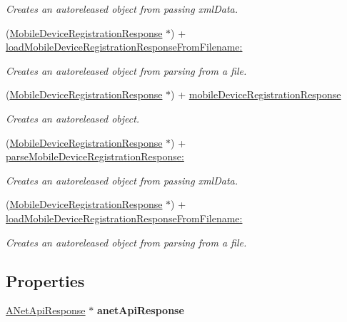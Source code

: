 \begin{DoxyCompactItemize}
\begin{DoxyCompactList}\small\item\em Creates an autoreleased object from passing xmlData. \item\end{DoxyCompactList}\item 
(\hyperlink{interface_mobile_device_registration_response}{MobileDeviceRegistrationResponse} $\ast$) + \hyperlink{interface_mobile_device_registration_response_a4dbc56ca78a8ef70d78fdc136e4c9665}{loadMobileDeviceRegistrationResponseFromFilename:}
\begin{DoxyCompactList}\small\item\em Creates an autoreleased object from parsing from a file. \item\end{DoxyCompactList}\item 
(\hyperlink{interface_mobile_device_registration_response}{MobileDeviceRegistrationResponse} $\ast$) + \hyperlink{interface_mobile_device_registration_response_aca1c52c278dd74542f75439de450c506}{mobileDeviceRegistrationResponse}
\begin{DoxyCompactList}\small\item\em Creates an autoreleased object. \item\end{DoxyCompactList}\item 
(\hyperlink{interface_mobile_device_registration_response}{MobileDeviceRegistrationResponse} $\ast$) + \hyperlink{interface_mobile_device_registration_response_ae0e564506ff65b450601f8ad48da2ecd}{parseMobileDeviceRegistrationResponse:}
\begin{DoxyCompactList}\small\item\em Creates an autoreleased object from passing xmlData. \item\end{DoxyCompactList}\item 
(\hyperlink{interface_mobile_device_registration_response}{MobileDeviceRegistrationResponse} $\ast$) + \hyperlink{interface_mobile_device_registration_response_a4dbc56ca78a8ef70d78fdc136e4c9665}{loadMobileDeviceRegistrationResponseFromFilename:}
\begin{DoxyCompactList}\small\item\em Creates an autoreleased object from parsing from a file. \item\end{DoxyCompactList}\end{DoxyCompactItemize}
\subsection*{Properties}
\begin{DoxyCompactItemize}
\item 
\hypertarget{interface_mobile_device_registration_response_ada30ff2f15cba24072964ed2578aef91}{
\hyperlink{interface_a_net_api_response}{ANetApiResponse} $\ast$ {\bfseries anetApiResponse}}
\label{interface_mobile_device_registration_response_ada30ff2f15cba24072964ed2578aef91}

\end{DoxyCompactItemize}


